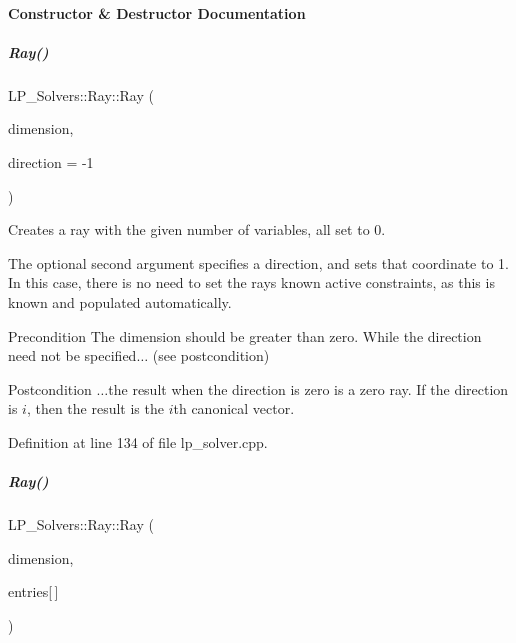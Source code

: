 \paragraph{Constructor \& Destructor Documentation}
\mbox{\label{group___c_l_s_solvers_ae6acfc48cec4f68f5855aae467f71095}} 
\subparagraph{\texorpdfstring{Ray()}{Ray()}\hspace{0.1cm}{\footnotesize\ttfamily [1/5]}}
{\footnotesize\ttfamily L\+P\+\_\+\+Solvers\+::\+Ray\+::\+Ray (\begin{DoxyParamCaption}\item[{N\+V\+A\+R\+\_\+\+T\+Y\+PE}]{dimension,  }\item[{long}]{direction = {\ttfamily -\/1} }\end{DoxyParamCaption})}



Creates a ray with the given number of variables, all set to 0. 

The optional second argument specifies a direction, and sets that coordinate to 1. In this case, there is no need to set the ray\textquotesingle{}s known active constraints, as this is known and populated automatically. \begin{DoxyPrecond}{Precondition}
The dimension should be greater than zero. While the direction need not be specified{$\dots$} (see postcondition) 
\end{DoxyPrecond}
\begin{DoxyPostcond}{Postcondition}
{$\dots$}the result when the direction is zero is a zero ray. If the direction is $ i $, then the result is the $i$th canonical vector. 
\end{DoxyPostcond}


Definition at line 134 of file lp\+\_\+solver.\+cpp.

\mbox{\label{group___c_l_s_solvers_ad69015f04db3f988b47cd05bae4f41a8}} 
\subparagraph{\texorpdfstring{Ray()}{Ray()}\hspace{0.1cm}{\footnotesize\ttfamily [2/5]}}
{\footnotesize\ttfamily L\+P\+\_\+\+Solvers\+::\+Ray\+::\+Ray (\begin{DoxyParamCaption}\item[{N\+V\+A\+R\+\_\+\+T\+Y\+PE}]{dimension,  }\item[{const R\+A\+Y\+E\+N\+T\+\_\+\+T\+Y\+PE}]{entries\mbox{[}$\,$\mbox{]} }\end{DoxyParamCaption})}




